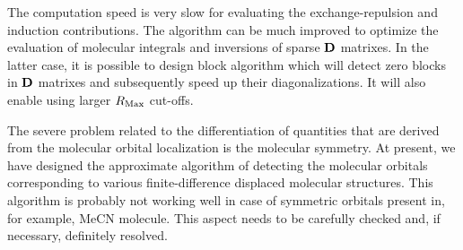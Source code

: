 \documentclass[a4paper,titlepage,twoside,fleqn,12pt]{book}
\begin{document}
\begin{refsection}
The computation speed is very slow for evaluating the exchange\hyp{}repulsion and induction
contributions. The algorithm can be much improved to optimize the
evaluation of molecular integrals and inversions of sparse $\bf D$ matrixes.
In the latter case, it is possible to design block algorithm which
will detect zero blocks in $\bf D$ matrixes and subsequently speed up their
diagonalizations. It will also enable using larger $R_{\rm Max}$ cut\hyp{}offs.

The severe problem related to the differentiation of quantities that are
derived from the molecular orbital localization is the molecular symmetry.
At present, we have designed the approximate algorithm of detecting the
molecular orbitals corresponding to various finite\hyp{}difference displaced
molecular structures. This algorithm is probably not working well in case of
symmetric orbitals present in, for example, MeCN molecule. This aspect needs 
to be carefully checked and, if necessary, definitely resolved.

\printbibliography[heading=subbibintoc,title={References}]
\end{refsection}

\end{document}
